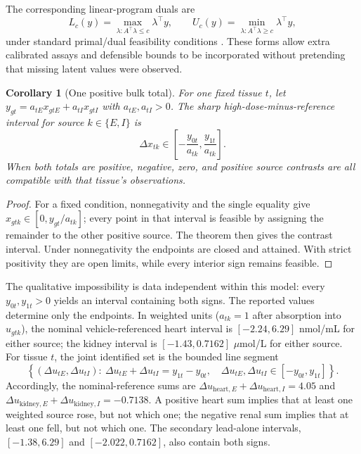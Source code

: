 \documentclass[11pt]{article}
\newtheorem{corollary}{Corollary}
\begin{document}
The corresponding linear-program duals are
\[
L_c(y)=\max_{\lambda:A^\top\lambda\leq c}\lambda^\top y,
\qquad
U_c(y)=\min_{\lambda:A^\top\lambda\geq c}\lambda^\top y,
\]
under standard primal/dual feasibility conditions \citep{boydvandenberghe2004}. These forms allow extra calibrated assays and defensible bounds to be incorporated without pretending that missing latent values were observed.

\begin{corollary}[One positive bulk total]
For one fixed tissue $t$, let $y_{gt}=a_{tE}x_{gtE}+a_{tI}x_{gtI}$ with $a_{tE},a_{tI}>0$. The sharp high-dose-minus-reference interval for source $k\in\{E,I\}$ is
\[
\Delta x_{tk}\in\left[-\frac{y_{0t}}{a_{tk}},\frac{y_{1t}}{a_{tk}}\right].
\]
When both totals are positive, negative, zero, and positive source contrasts are all compatible with that tissue's observations.
\end{corollary}

\begin{proof}
For a fixed condition, nonnegativity and the single equality give $x_{gtk}\in[0,y_{gt}/a_{tk}]$; every point in that interval is feasible by assigning the remainder to the other positive source. The theorem then gives the contrast interval. Under nonnegativity the endpoints are closed and attained. With strict positivity they are open limits, while every interior sign remains feasible.
\end{proof}

The qualitative impossibility is data independent within this model: every $y_{0t},y_{1t}>0$ yields an interval containing both signs. The reported values determine only the endpoints. In weighted units ($a_{tk}=1$ after absorption into $u_{gtk}$), the nominal vehicle-referenced heart interval is $[-2.24,6.29]$ nmol/mL for either source; the kidney interval is $[-1.43,0.7162]$ $\mu$mol/L for either source. For tissue $t$, the joint identified set is the bounded line segment
\[
\left\{(\Delta u_{tE},\Delta u_{tI}):\ \Delta u_{tE}+\Delta u_{tI}=y_{1t}-y_{0t},\quad
\Delta u_{tE},\Delta u_{tI}\in[-y_{0t},y_{1t}]\right\}.
\]
Accordingly, the nominal-reference sums are $\Delta u_{\mathrm{heart},E}+\Delta u_{\mathrm{heart},I}=4.05$ and $\Delta u_{\mathrm{kidney},E}+\Delta u_{\mathrm{kidney},I}=-0.7138$. A positive heart sum implies that at least one weighted source rose, but not which one; the negative renal sum implies that at least one fell, but not which one. The secondary lead-alone intervals, $[-1.38,6.29]$ and $[-2.022,0.7162]$, also contain both signs.
\end{document}
